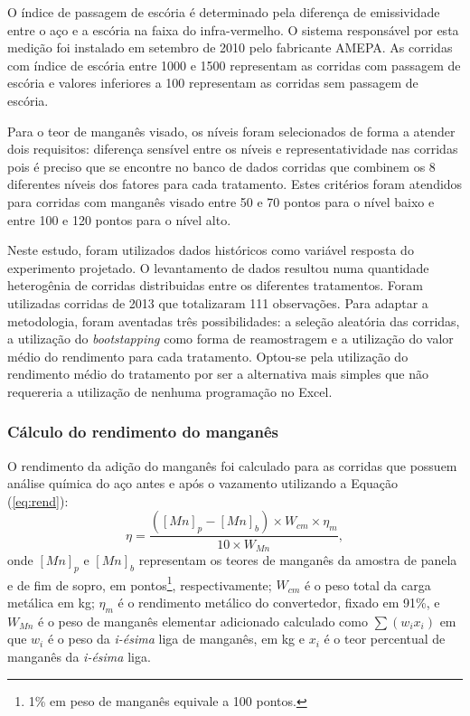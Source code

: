 	O índice de passagem de escória é determinado pela diferença de emissividade entre o aço e a escória na faixa do infra-vermelho. O sistema responsável por esta medição foi instalado em setembro de 2010 pelo fabricante AMEPA. As corridas com índice de escória entre 1000 e 1500 representam as corridas com passagem de escória e valores inferiores a 100 representam as corridas sem passagem de escória.
	
	Para o teor de manganês visado, os níveis foram selecionados de forma a atender dois requisitos: diferença sensível entre os níveis e representatividade nas corridas pois é preciso que se encontre no banco de dados corridas que combinem os 8 diferentes níveis dos fatores para cada tratamento. Estes critérios foram atendidos para corridas com manganês visado entre 50 e 70 pontos para o nível baixo e entre 100 e 120 pontos para o nível alto.
	
	Neste estudo, foram utilizados dados históricos como variável resposta do experimento projetado. O levantamento de dados resultou numa quantidade heterogênia de corridas distribuidas entre os diferentes tratamentos. Foram utilizadas corridas de 2013 que totalizaram 111 observações. Para adaptar a metodologia, foram aventadas três possibilidades: a seleção aleatória das corridas, a utilização do \textit{bootstapping}\cite{wiki:boot} como forma de reamostragem e a utilização do valor médio do rendimento para cada tratamento. Optou-se pela utilização do rendimento médio do tratamento por ser a alternativa mais simples que não requereria a utilização de nenhuma programação no Excel.
	\subsubsection{Cálculo do rendimento do manganês}
		\label{sec:calcrend}
		O rendimento da adição do manganês foi calculado para as corridas que possuem análise química do aço antes e após o vazamento utilizando a Equação (\ref{eq:rend}):
			\begin{equation}
			\label{eq:rend}
			\eta = \frac{([Mn]_p - [Mn]_b)\times W_{cm} \times \eta_m}{10 \times W_{Mn}},
			\end{equation}
		\noindent onde $[Mn]_p$ e $[Mn]_b$ representam os teores de manganês da amostra de panela e de fim de sopro, em pontos\footnote{1\% em peso de manganês equivale a 100 pontos.}, respectivamente; $W_{cm}$ é o peso total da carga metálica em kg; $\eta_m$ é o rendimento metálico do convertedor, fixado em 91\%, e $W_{Mn}$ é o peso de manganês elementar adicionado calculado como $\sum (w_i x_i)$ em que $w_i$ é o peso da \textit{i-ésima} liga de manganês, em kg e $x_i$ é o teor percentual de manganês da \textit{i-ésima} liga.
		

